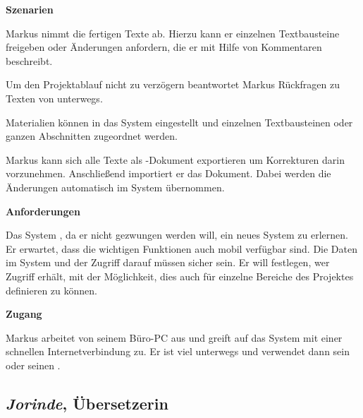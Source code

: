 \begin{multicols}{2}
\textbf{Szenarien}

Markus nimmt die fertigen Texte ab. Hierzu kann er einzelnen Textbausteine freigeben oder Änderungen anfordern, die er mit Hilfe von Kommentaren beschreibt. 

Um den Projektablauf nicht zu verzögern beantwortet Markus Rückfragen zu Texten von unterwegs.

Materialien können in das System eingestellt und einzelnen Textbausteinen oder ganzen Abschnitten zugeordnet werden.

Markus kann sich alle Texte als -Dokument exportieren um Korrekturen darin vorzunehmen. Anschließend importiert er das Dokument. Dabei werden die Änderungen automatisch im System übernommen.

\textbf{Anforderungen}

Das System , da er nicht gezwungen werden will, ein neues System zu erlernen. Er erwartet, dass die wichtigen Funktionen auch mobil verfügbar sind. Die Daten im System und der Zugriff darauf müssen sicher sein. Er will festlegen, wer Zugriff erhält, mit der Möglichkeit, dies auch für einzelne Bereiche des Projektes definieren zu können.

\textbf{Zugang}

Markus arbeitet von seinem Büro-PC aus und greift auf das System mit einer schnellen Internetverbindung zu. Er ist viel unterwegs und verwendet dann sein  oder seinen .

\end{multicols}

\pagebreak

\subsection{\emph{Jorinde}, Übersetzerin}\label{p:jorinde}


